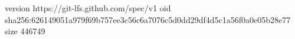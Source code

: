 version https://git-lfs.github.com/spec/v1
oid sha256:626149051a979f69b757ee3c56c6a7076c5d0dd29df4d5c1a56f0a0e05b28e77
size 446749
